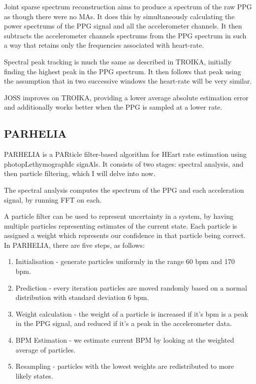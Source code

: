 \documentclass[12pt,a4paper,twoside,openright]{report}
\begin{document}
Joint sparse spectrum reconstruction aims to produce a spectrum of the raw PPG
as though there were no MAs. It does this by simultaneously calculating the
power spectrums of the PPG signal and all the accelerometer channels. It then
subtracts the accelerometer channels spectrums from the PPG spectrum in such a
way that retains only the frequencies associated with heart-rate.

Spectral peak tracking is much the same as described in TROIKA, initially
finding the highest peak in the PPG spectrum. It then follows that peak using
the assumption that in two successive windows the heart-rate will be very
similar.

JOSS improves on TROIKA, providing a lower average absolute estimation error
and additionally works better when the PPG is sampled at a lower rate.


\subsection{PARHELIA}

PARHELIA \cite{Fujita18} is a PARticle filter-based algorithm for HEart rate
estimation using photopLethymographIc signAls. It consists of two stages:
spectral analysis, and then particle filtering, which I will delve into now.

The spectral analysis computes the spectrum of the PPG and each acceleration
signal, by running FFT on each. 

A particle filter can be used to represent uncertainty in a system, by having
multiple particles representing estimates of the current state. Each particle
is assigned a weight which represents our confidence in that particle being
correct. In PARHELIA, there are five steps, as follows:
\begin{enumerate}
	\item Initialisation - generate particles uniformly in the range 60
		bpm and 170 bpm.

	\item Prediction - every iteration particles are moved randomly based on a normal
		distribution with standard deviation 6 bpm.

	\item Weight calculation - the weight of a particle is increased if
		it's bpm is a peak in the PPG signal, and reduced if it's a
		peak in the accelerometer data.

	\item BPM Estimation - we estimate current BPM by looking at the
		weighted average of particles.

	\item Resampling - particles with the lowest weights are redistributed
		to more likely states.
\end{enumerate}
\end{document}

